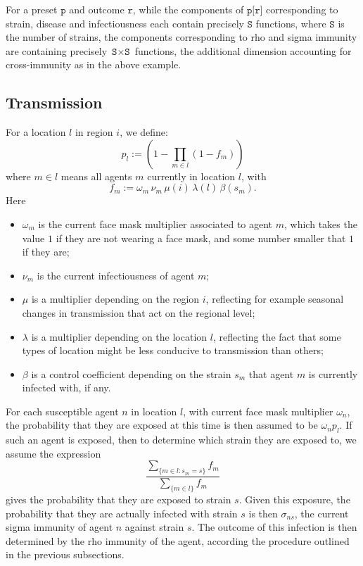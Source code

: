 \documentclass[10pt,letterpaper]{article}
\begin{document}
For a preset $\texttt{p}$ and outcome $\texttt{r}$, while the components of $\texttt{p[r]}$ corresponding to strain, disease and infectiousness each contain precisely $\texttt{S}$ functions, where $\texttt{S}$ is the number of strains, the components corresponding to rho and sigma immunity are containing precisely $\texttt{S} \times \texttt{S}$ functions, the additional dimension accounting for cross-immunity as in the above example.

\subsection{Transmission}

For a location $l$ in region $i$, we define:
\begin{equation*}
p_l := \left(1 - \prod_{m \in l} (1 - f_m)\right)
\end{equation*}
where $m \in l$ means all agents $m$ currently in location $l$, with
\begin{equation*}
f_m  := \omega_m\, \nu_m\, \mu(i)\, \lambda(l)\, \beta(s_m).
\end{equation*}
Here
\begin{itemize}
\item $\omega_m$ is the current face mask multiplier associated to agent $m$, which takes the value $1$ if they are not wearing a face mask, and some number smaller that $1$ if they are;
\item $\nu_m$ is the current infectiousness of agent $m$;
\item $\mu$ is a multiplier depending on the region $i$, reflecting for example seasonal changes in transmission that act on the regional level;
\item $\lambda$ is a multiplier depending on the location $l$, reflecting the fact that some types of location might be less conducive to transmission than others;
\item $\beta$ is a control coefficient depending on the strain $s_m$ that agent $m$ is currently infected with, if any.
\end{itemize}
For each susceptible agent $n$ in location $l$, with current face mask multiplier $\omega_n$, the probability that they are exposed at this time is then assumed to be $\omega_n p_l$. If such an agent is exposed, then to determine which strain they are exposed to, we assume the expression
\begin{equation*}
\frac{\sum_{\{m \in l: s_m = s\}} f_m}{\sum_{\{m \in l\}} f_m}
\end{equation*}
gives the probability that they are exposed to strain $s$. Given this exposure, the probability that they are actually infected with strain $s$ is then $\sigma_{ns}$, the current sigma immunity of agent $n$ against strain $s$. The outcome of this infection is then determined by the rho immunity of the agent, according the procedure outlined in the previous subsections.
\end{document}

